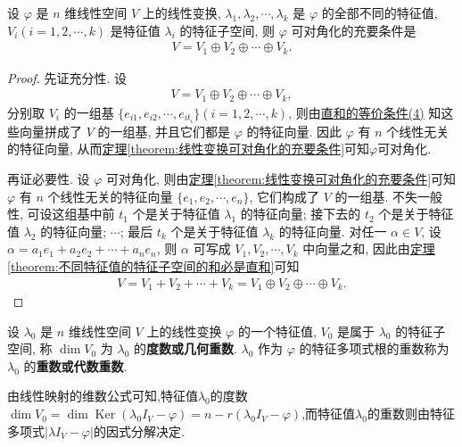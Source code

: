 \documentclass[lang=cn,newtx,10pt,scheme=chinese]{elegantbook}
\begin{document}
\begin{theorem}[线性变换可对角化的充要条件]\label{theorem:线性变换可对角化的充要条件2}
设 $\varphi$ 是 $n$ 维线性空间 $V$ 上的线性变换, $\lambda_1, \lambda_2, \cdots, \lambda_k$ 是 $\varphi$ 的全部不同的特征值, $V_i (i = 1, 2, \cdots, k)$ 是特征值 $\lambda_i$ 的特征子空间, 则 $\varphi$ 可对角化的充要条件是
\begin{align*}
V = V_1 \oplus V_2 \oplus \cdots \oplus V_k.
\end{align*}
\end{theorem}
\begin{proof}
先证充分性. 设
\begin{align*}
V = V_1 \oplus V_2 \oplus \cdots \oplus V_k,
\end{align*}
分别取 $V_i$ 的一组基 $\{e_{i1}, e_{i2}, \cdots, e_{it_i}\} (i = 1, 2, \cdots, k)$, 则由\hyperref[theorem:直和的等价条件]{直和的等价条件(4)} 知这些向量拼成了 $V$ 的一组基, 并且它们都是 $\varphi$ 的特征向量. 因此 $\varphi$ 有 $n$ 个线性无关的特征向量, 从而\hyperref[theorem:线性变换可对角化的充要条件]{定理\ref{theorem:线性变换可对角化的充要条件}}可知$\varphi$可对角化.

再证必要性. 设 $\varphi$ 可对角化, 则由\hyperref[theorem:线性变换可对角化的充要条件]{定理\ref{theorem:线性变换可对角化的充要条件}}可知$\varphi$ 有 $n$ 个线性无关的特征向量 $\{e_1, e_2, \cdots, e_n\}$, 它们构成了 $V$ 的一组基. 不失一般性, 可设这组基中前 $t_1$ 个是关于特征值 $\lambda_1$ 的特征向量; 接下去的 $t_2$ 个是关于特征值 $\lambda_2$ 的特征向量; $\cdots$; 最后 $t_k$ 个是关于特征值 $\lambda_k$ 的特征向量. 对任一 $\alpha \in V$, 设 $\alpha = a_1 e_1 + a_2 e_2 + \cdots + a_n e_n$, 则 $\alpha$ 可写成 $V_1, V_2, \cdots, V_k$ 中向量之和, 因此由\hyperref[theorem:不同特征值的特征子空间的和必是直和]{定理\ref{theorem:不同特征值的特征子空间的和必是直和}}可知
\begin{align*}
V = V_1 + V_2 + \cdots + V_k = V_1 \oplus V_2 \oplus \cdots \oplus V_k.
\end{align*}
\end{proof}


\begin{definition}[线性变换的几何重数与代数重数]
设 $\lambda_0$ 是 $n$ 维线性空间 $V$ 上的线性变换 $\varphi$ 的一个特征值, $V_0$ 是属于 $\lambda_0$ 的特征子空间, 称 $\dim V_0$ 为 $\lambda_0$ 的\textbf{度数或几何重数}. $\lambda_0$ 作为 $\varphi$ 的特征多项式根的重数称为 $\lambda_0$ 的\textbf{重数或代数重数}.
\end{definition}
\begin{note}
由线性映射的维数公式可知,特征值$\lambda_0$的度数$\dim V_0 = \dim \operatorname{Ker}(\lambda_0 I_V - \varphi) = n - r(\lambda_0 I_V - \varphi)$,而特征值$\lambda_0$的重数则由特征多项式$|\lambda I_V - \varphi|$的因式分解决定.
\end{note}
\end{document}
